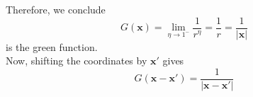 \documentclass[letterpage]{article}
\begin{document}
\noindent
Therefore, we conclude
\begin{equation*}
  G(\textbf{x}) = \lim_{\eta \to 1^-} \frac{1}{r^\eta} = \frac{1}{r}
  = \frac{1}{|\textbf{x}|}
\end{equation*}
is the green function.\\

\noindent
Now, shifting the coordinates by $\mathbf{x'}$ gives
\begin{equation*}
  G(\textbf{x} - \textbf{x}') = \frac{1}{|\textbf{x} - \textbf{x}'|}
\end{equation*}
\end{document}
